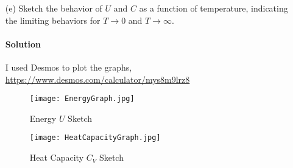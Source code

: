 \documentclass{article}
\begin{document}
\begin{enumerate}
\clearpage
		
		\item[(e)] Sketch the behavior of $U$ and $C$ as a function of temperature, indicating the limiting behaviors for $T \to 0$ and $T \to \infty$.
		\paragraph{Solution} I used Desmos to plot the graphs, \href{https://www.desmos.com/calculator/mys8m9lrz8}{https://www.desmos.com/calculator/mys8m9lrz8}
		
		\begin{figure}[htbp]
			\centering
			\caption{Energy $U$ Sketch}
			\texttt{[image: EnergyGraph.jpg]}
		\end{figure}
		\begin{figure}[htbp]
			\centering
			\caption{Heat Capacity $C_V$ Sketch}
			\texttt{[image: HeatCapacityGraph.jpg]}
		\end{figure}
		
		
	\end{enumerate}
	
\clearpage
	
\end{document}
